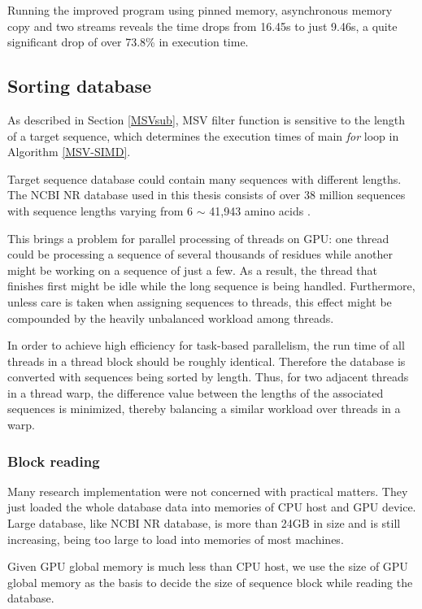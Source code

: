 Running the improved program using pinned memory, asynchronous memory copy and two streams reveals the time drops from 16.45s to just 9.46s, a quite significant drop of over 73.8\% in execution time.

\subsection{Sorting database}
\label{dbsort}
As described in Section \ref{MSVsub}, MSV filter function is sensitive to the length of a target sequence, which determines the execution times of main \emph{for} loop in Algorithm \ref{MSV-SIMD}. 

Target sequence database could contain many sequences with different lengths. The NCBI NR database used in this thesis consists of over 38 million sequences with sequence lengths varying from 6 $\sim$ 41,943 amino acids \citep{NCBI}.

This brings a problem for parallel processing of threads on GPU: one thread could be processing a sequence of several thousands of residues while another might be working on a sequence of just a few. As a result, the thread that finishes first might be idle while the long sequence is being handled. Furthermore, unless care is taken when assigning sequences to threads, this effect might be compounded by the heavily unbalanced workload among threads.

In order to achieve high efficiency for task-based parallelism, the run time of all threads in a thread block should be roughly identical. Therefore the database is converted with sequences being sorted by length. Thus, for two adjacent threads in a thread warp, the difference value between the lengths of the associated sequences is minimized, thereby balancing a similar workload over threads in a warp.

\subsubsection*{Block reading}
Many research implementation were not concerned with practical matters. They just loaded the whole database data into memories of CPU host and GPU device. Large database, like NCBI NR database, is more than 24GB in size and is still increasing, being too large to load into memories of most machines.

Given GPU global memory is much less than CPU host, we use the size of GPU global memory as the basis to decide the size of sequence block while reading the database.

